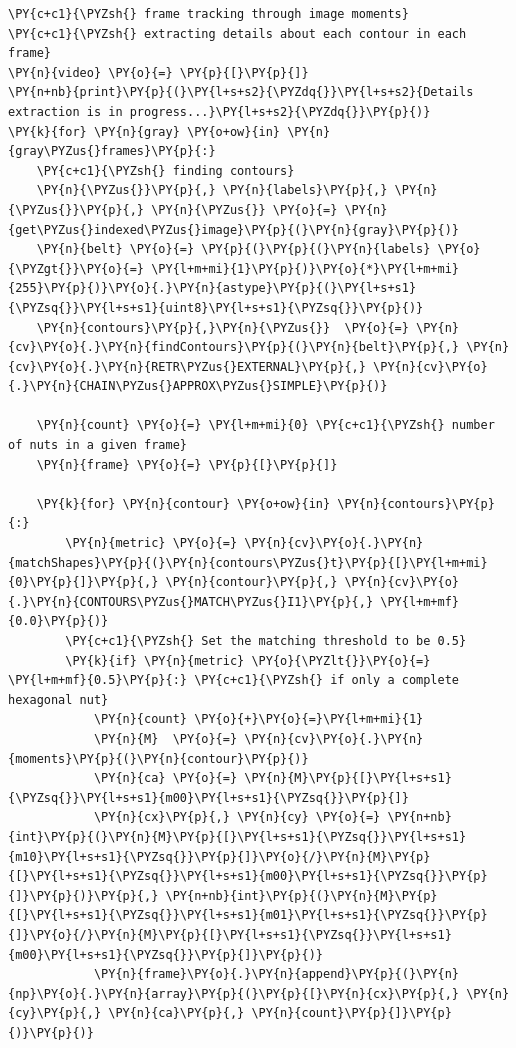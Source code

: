 \documentclass[a4paper,11pt]{article}%
\begin{document}
    \begin{tcolorbox}[breakable, size=fbox, boxrule=1pt, pad at break*=1mm,colback=cellbackground, colframe=cellborder]
\begin{Verbatim}[commandchars=\\\{\}]
\PY{c+c1}{\PYZsh{} frame tracking through image moments}
\PY{c+c1}{\PYZsh{} extracting details about each contour in each frame}
\PY{n}{video} \PY{o}{=} \PY{p}{[}\PY{p}{]}
\PY{n+nb}{print}\PY{p}{(}\PY{l+s+s2}{\PYZdq{}}\PY{l+s+s2}{Details extraction is in progress...}\PY{l+s+s2}{\PYZdq{}}\PY{p}{)}
\PY{k}{for} \PY{n}{gray} \PY{o+ow}{in} \PY{n}{gray\PYZus{}frames}\PY{p}{:}
    \PY{c+c1}{\PYZsh{} finding contours}
    \PY{n}{\PYZus{}}\PY{p}{,} \PY{n}{labels}\PY{p}{,} \PY{n}{\PYZus{}}\PY{p}{,} \PY{n}{\PYZus{}} \PY{o}{=} \PY{n}{get\PYZus{}indexed\PYZus{}image}\PY{p}{(}\PY{n}{gray}\PY{p}{)}
    \PY{n}{belt} \PY{o}{=} \PY{p}{(}\PY{p}{(}\PY{n}{labels} \PY{o}{\PYZgt{}}\PY{o}{=} \PY{l+m+mi}{1}\PY{p}{)}\PY{o}{*}\PY{l+m+mi}{255}\PY{p}{)}\PY{o}{.}\PY{n}{astype}\PY{p}{(}\PY{l+s+s1}{\PYZsq{}}\PY{l+s+s1}{uint8}\PY{l+s+s1}{\PYZsq{}}\PY{p}{)}
    \PY{n}{contours}\PY{p}{,}\PY{n}{\PYZus{}}  \PY{o}{=} \PY{n}{cv}\PY{o}{.}\PY{n}{findContours}\PY{p}{(}\PY{n}{belt}\PY{p}{,} \PY{n}{cv}\PY{o}{.}\PY{n}{RETR\PYZus{}EXTERNAL}\PY{p}{,} \PY{n}{cv}\PY{o}{.}\PY{n}{CHAIN\PYZus{}APPROX\PYZus{}SIMPLE}\PY{p}{)}

    \PY{n}{count} \PY{o}{=} \PY{l+m+mi}{0} \PY{c+c1}{\PYZsh{} number of nuts in a given frame}
    \PY{n}{frame} \PY{o}{=} \PY{p}{[}\PY{p}{]}

    \PY{k}{for} \PY{n}{contour} \PY{o+ow}{in} \PY{n}{contours}\PY{p}{:}
        \PY{n}{metric} \PY{o}{=} \PY{n}{cv}\PY{o}{.}\PY{n}{matchShapes}\PY{p}{(}\PY{n}{contours\PYZus{}t}\PY{p}{[}\PY{l+m+mi}{0}\PY{p}{]}\PY{p}{,} \PY{n}{contour}\PY{p}{,} \PY{n}{cv}\PY{o}{.}\PY{n}{CONTOURS\PYZus{}MATCH\PYZus{}I1}\PY{p}{,} \PY{l+m+mf}{0.0}\PY{p}{)}
        \PY{c+c1}{\PYZsh{} Set the matching threshold to be 0.5}
        \PY{k}{if} \PY{n}{metric} \PY{o}{\PYZlt{}}\PY{o}{=} \PY{l+m+mf}{0.5}\PY{p}{:} \PY{c+c1}{\PYZsh{} if only a complete hexagonal nut}
            \PY{n}{count} \PY{o}{+}\PY{o}{=}\PY{l+m+mi}{1}
            \PY{n}{M}  \PY{o}{=} \PY{n}{cv}\PY{o}{.}\PY{n}{moments}\PY{p}{(}\PY{n}{contour}\PY{p}{)}
            \PY{n}{ca} \PY{o}{=} \PY{n}{M}\PY{p}{[}\PY{l+s+s1}{\PYZsq{}}\PY{l+s+s1}{m00}\PY{l+s+s1}{\PYZsq{}}\PY{p}{]}
            \PY{n}{cx}\PY{p}{,} \PY{n}{cy} \PY{o}{=} \PY{n+nb}{int}\PY{p}{(}\PY{n}{M}\PY{p}{[}\PY{l+s+s1}{\PYZsq{}}\PY{l+s+s1}{m10}\PY{l+s+s1}{\PYZsq{}}\PY{p}{]}\PY{o}{/}\PY{n}{M}\PY{p}{[}\PY{l+s+s1}{\PYZsq{}}\PY{l+s+s1}{m00}\PY{l+s+s1}{\PYZsq{}}\PY{p}{]}\PY{p}{)}\PY{p}{,} \PY{n+nb}{int}\PY{p}{(}\PY{n}{M}\PY{p}{[}\PY{l+s+s1}{\PYZsq{}}\PY{l+s+s1}{m01}\PY{l+s+s1}{\PYZsq{}}\PY{p}{]}\PY{o}{/}\PY{n}{M}\PY{p}{[}\PY{l+s+s1}{\PYZsq{}}\PY{l+s+s1}{m00}\PY{l+s+s1}{\PYZsq{}}\PY{p}{]}\PY{p}{)}
            \PY{n}{frame}\PY{o}{.}\PY{n}{append}\PY{p}{(}\PY{n}{np}\PY{o}{.}\PY{n}{array}\PY{p}{(}\PY{p}{[}\PY{n}{cx}\PY{p}{,} \PY{n}{cy}\PY{p}{,} \PY{n}{ca}\PY{p}{,} \PY{n}{count}\PY{p}{]}\PY{p}{)}\PY{p}{)}


\end{Verbatim}
\end{tcolorbox}
\end{document}
